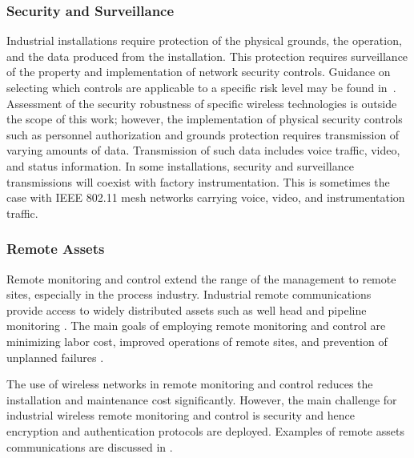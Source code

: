     
    \subsubsection{Security and Surveillance}  
    Industrial installations require protection of the physical grounds, the operation, and the data produced from the installation.  This protection requires surveillance of the property and implementation of network security controls. Guidance on selecting which controls are applicable to a specific risk level may be found in~\cite{Stouffer2015}. Assessment of the security robustness of specific wireless technologies is outside the scope of this work; however, the implementation of physical security controls such as personnel authorization and grounds protection requires transmission of varying amounts of data.  Transmission of such data includes voice traffic, video, and status information.  In some installations, security and surveillance transmissions will coexist with factory instrumentation.  This is sometimes the case with IEEE 802.11 mesh networks carrying voice, video, and instrumentation traffic.  
    
    \subsubsection{Remote Assets} 
Remote monitoring and control extend the range of the management to remote sites, especially in the process industry. Industrial remote communications provide access to widely distributed assets such as well head and pipeline monitoring \cite{PS-remote2}. The main goals of employing remote monitoring and control are minimizing labor cost, improved operations of remote sites, and prevention of  unplanned failures \cite{PS-remote1}. 

The use of wireless networks in remote monitoring and control reduces the installation and maintenance cost significantly. However, the main challenge for industrial wireless remote monitoring and control is security and hence encryption and authentication protocols are deployed. Examples of remote assets communications are discussed in \cite{PS-remote2}.      
    
